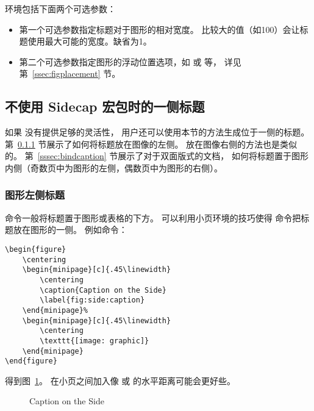  环境包括下面两个可选参数：
\begin{itemize}
	\item 第一个可选参数指定标题对于图形的相对宽度。
	比较大的值（如100）会让标题使用最大可能的宽度。缺省为1。
	\item 第二个可选参数指定图形的浮动位置选项，如 \opt{[htp]}或 \opt{[!ht]} 等，
	详见第~\ref{ssec:figplacement} 节。
\end{itemize}

\subsection{不使用 Sidecap 宏包时的一侧标题}

如果  没有提供足够的灵活性，
用户还可以使用本节的方法生成位于一侧的标题。
第~\ref{sssec:leftcaption} 节展示了如何将标题放在图像的左侧。
放在图像右侧的方法也是类似的。
第~\ref{sssec:bindcaption} 节展示了对于双面版式的文档，
如何将标题置于图形内侧（奇数页中为图形的左侧，偶数页中为图形的右侧）。

\subsubsection{图形左侧标题}\label{sssec:leftcaption}

  命令一般将标题置于图形或表格的下方。
可以利用小页环境的技巧使得  命令把标题放在图形的一侧。
例如命令：
\begin{lstlisting}
\begin{figure}
	\centering
	\begin{minipage}[c]{.45\linewidth}
		\centering
		\caption{Caption on the Side}
		\label{fig:side:caption}
	\end{minipage}%
	\begin{minipage}[c]{.45\linewidth}
		\centering
		\texttt{[image: graphic]}
	\end{minipage}
\end{figure}
\end{lstlisting}
得到图~\ref{fig:side:caption}。
在小页之间加入像  或  的水平距离可能会更好些。

\begin{figure}
	\centering
	\begin{minipage}[c]{.45\linewidth}
		\centering
		\caption{Caption on the Side}
		\label{fig:side:caption}
	\end{minipage}%
	\begin{minipage}[c]{.45\linewidth}
		\centering
		\resizebox{\linewidth}{!}{\usebox{\boxgraphic}}
	\end{minipage}
\end{figure}

